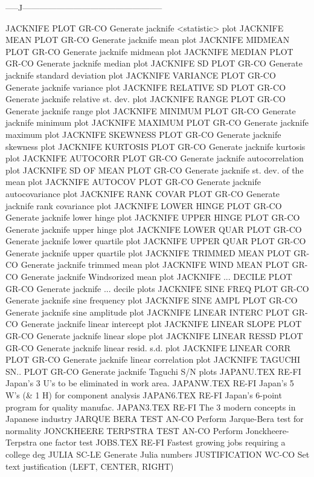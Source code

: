 -----J--------------------------------------------------

JACKNIFE PLOT               GR-CO Generate jacknife <statistic> plot
JACKNIFE MEAN PLOT          GR-CO Generate jacknife mean plot
JACKNIFE MIDMEAN PLOT       GR-CO Generate jacknife midmean plot
JACKNIFE MEDIAN PLOT        GR-CO Generate jacknife median plot
JACKNIFE SD PLOT            GR-CO Generate jacknife standard deviation plot
JACKNIFE VARIANCE PLOT      GR-CO Generate jacknife variance plot
JACKNIFE RELATIVE SD PLOT   GR-CO Generate jacknife relative st. dev. plot
JACKNIFE RANGE PLOT         GR-CO Generate jacknife range plot
JACKNIFE MINIMUM PLOT       GR-CO Generate jacknife minimum plot
JACKNIFE MAXIMUM PLOT       GR-CO Generate jacknife maximum plot
JACKNIFE SKEWNESS PLOT      GR-CO Generate jacknife skewness plot
JACKNIFE KURTOSIS PLOT      GR-CO Generate jacknife kurtosis plot
JACKNIFE AUTOCORR PLOT      GR-CO Generate jacknife autocorrelation plot
JACKNIFE SD OF MEAN PLOT    GR-CO Generate jacknife st. dev. of the mean plot
JACKNIFE AUTOCOV PLOT       GR-CO Generate jacknife autocovariance plot
JACKNIFE RANK COVAR PLOT    GR-CO Generate jacknife rank covariance plot
JACKNIFE LOWER HINGE PLOT   GR-CO Generate jacknife lower hinge plot
JACKNIFE UPPER HINGE PLOT   GR-CO Generate jacknife upper hinge plot
JACKNIFE LOWER QUAR PLOT    GR-CO Generate jacknife lower quartile plot
JACKNIFE UPPER QUAR PLOT    GR-CO Generate jacknife upper quartile plot
JACKNIFE TRIMMED MEAN PLOT  GR-CO Generate jacknife trimmed mean plot
JACKNIFE WIND MEAN PLOT     GR-CO Generate jacknife Windsorized mean plot
JACKNIFE ... DECILE PLOT    GR-CO Generate jacknife ... decile plots
JACKNIFE SINE FREQ PLOT     GR-CO Generate jacknife sine frequency plot
JACKNIFE SINE AMPL PLOT     GR-CO Generate jacknife sine amplitude plot
JACKNIFE LINEAR INTERC PLOT GR-CO Generate jacknife linear intercept plot
JACKNIFE LINEAR SLOPE PLOT  GR-CO Generate jacknife linear slope plot
JACKNIFE LINEAR RESSD PLOT  GR-CO Generate jacknife linear resid. s.d. plot
JACKNIFE LINEAR CORR PLOT   GR-CO Generate jacknife linear correlation plot
JACKNIFE TAGUCHI SN.. PLOT  GR-CO Generate jacknife Taguchi S/N plots
JAPANU.TEX                  RE-FI Japan's 3  U's to be eliminated in work area.
JAPANW.TEX                  RE-FI Japan's 5 W's (& 1 H) for component analysis
JAPAN6.TEX                  RE-FI Japan's 6-point program for quality manufac.
JAPAN3.TEX                  RE-FI The 3 modern concepts in Japanese industry
JARQUE BERA TEST            AN-CO Perform Jarque-Bera test for normality
JONCKHEERE TERPSTRA TEST    AN-CO Perform Jonckheere-Terpstra one factor test
JOBS.TEX                    RE-FI Fastest growing jobs requiring a college deg
JULIA                       SC-LE Generate Julia numbers
JUSTIFICATION               WC-CO Set text justification (LEFT, CENTER, RIGHT)

